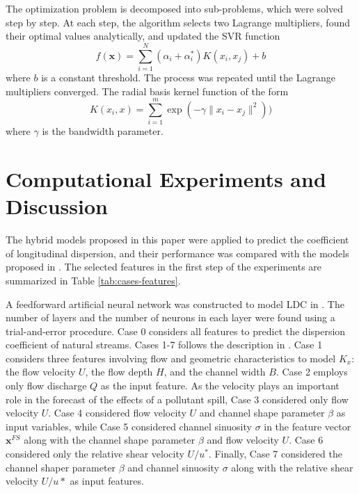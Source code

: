 \documentclass[a4paper,12pt, english]{article}
\newcommand{\x}{\mathbf{x}}
\begin{document}
The optimization problem is decomposed  into sub-problems, which were solved step by step. At each step, the algorithm selects two Lagrange multipliers, found their optimal values analytically, and updated the SVR function  \cite{were:2015}
$$f(\x) = \sum_{i=1}^{N} (\alpha_i+\alpha_i^*) K(x_i,x_j) +b$$
where $b$ is a constant threshold.
The process was repeated until the Lagrange multipliers converged.
The  radial basis kernel function of the form 
\begin{equation}
 \label{eq:svr-kernel}
K(x_i,x) = \sum_{i=1}^{m} \exp(-\gamma \|x_i-x_j\|^2) )
\end{equation}
% 
where $\gamma$ is the bandwidth parameter.


\section{\label{sec:results} Computational Experiments and Discussion}

The hybrid models proposed in this paper were applied to predict the coefficient of longitudinal dispersion, and their performance was compared with the models proposed in \cite{tayfur2005predicting}. 
The selected features in the first step of the experiments are summarized in 
Table \ref{tab:cases-features}.

A feedforward artificial neural network was constructed to model LDC in \cite{tayfur2005predicting}. The number of layers and the number of neurons in each layer were found using a trial-and-error procedure.
Case 0  considers all features to predict the dispersion coefficient of natural streams.
Cases 1-7 follows the description in \cite{tayfur2005predicting}.
Case 1  considers three features involving flow and geometric characteristics to model $K_x$: the flow velocity $U$, the flow depth $H$, and the channel width $B$.
Case 2 employs only flow discharge $Q$ as the input feature.
As the velocity plays an important role in the forecast of the effects of a pollutant spill, Case 3  considered only flow velocity $U$.
Case 4 considered flow velocity $U$ and channel shape parameter $\beta$ as input variables, while Case 5 considered channel sinuosity $\sigma$ in the feature vector $\x^{FS}$ along with the channel shape parameter $\beta$ and flow velocity $U$.
Case 6 considered only the relative shear velocity $U/u^*$.
Finally, Case 7 considered the channel shaper parameter $\beta$ and channel sinuosity $\sigma$ along with the relative shear velocity $U/u*$ as input features.
\end{document}
